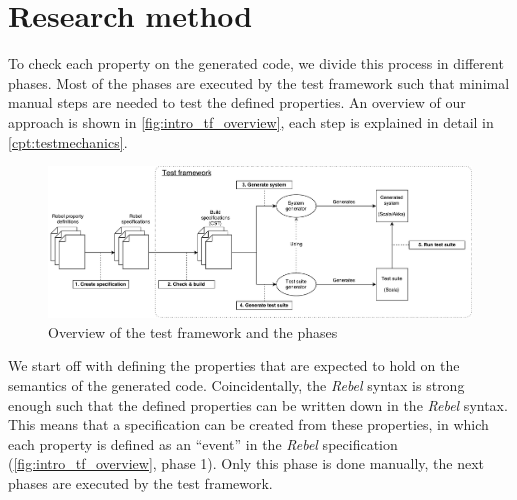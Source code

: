 \section{Research method}
To check each property on the generated code, we divide this
process in different phases. Most of the phases are executed by the test
framework such that minimal manual steps are needed to test the defined
properties. An overview of our approach is shown in
\autoref{fig:intro_tf_overview}, each step is explained in detail in
\autoref{cpt:testmechanics}.
\begin{figure}[!ht]
	\includegraphics[width=\linewidth]{figures/testmechanics_overview}
\caption{Overview of the test framework and the phases}
\label{fig:intro_tf_overview}
\centering
\end{figure}
\FloatBarrier\noindent
%
We start off with defining the properties that are expected to hold on the
semantics of the generated code. Coincidentally, the \textit{Rebel} syntax is strong enough such that the defined properties can be written down in the \textit{Rebel} syntax. This means that a specification can be created from these properties, in which each property is defined as an ``event'' in the \textit{Rebel} specification (\autoref{fig:intro_tf_overview}, phase 1). Only this phase is done
manually, the next phases are executed by the test framework.\\
\\
